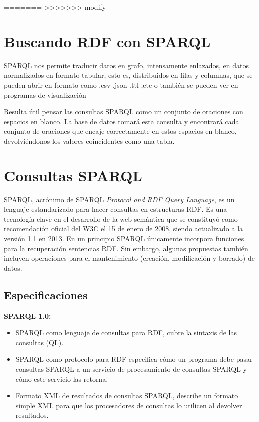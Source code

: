 \documentclass[conference]{IEEEtran}
\begin{document}
\vspace{0.2cm}




\vspace{0.2cm}

=======
>>>>>>> modify
\section{Buscando RDF con SPARQL}
SPARQL nos permite traducir datos en grafo, intensamente enlazados, en datos normalizados en formato tabular, esto es, distribuidos en filas y columnas, que se pueden abrir  en formato como .csv .json .ttl ,etc o también se pueden ver en programas de visualización


Resulta útil pensar las consultas SPARQL como un conjunto de oraciones con espacios en blanco. La base de datos tomará esta consulta y encontrará cada conjunto de oraciones que encaje correctamente en estos espacios en blanco, devolviéndonos los valores coincidentes como una tabla.
\vspace{0.2cm}




\section{Consultas SPARQL}


SPARQL, acrónimo de SPARQL \textit{Protocol and RDF Query Language}, es un lenguaje estandarizado para hacer consultas en estructuras RDF.  Es una tecnología clave en el desarrollo de la web semántica que se constituyó como recomendación oficial del W3C el 15 de enero de 2008, siendo actualizado a la versión 1.1 en 2013\cite{b1}. En un principio SPARQL únicamente incorpora funciones para la recuperación sentencias RDF. Sin embargo, algunas propuestas también incluyen operaciones para el mantenimiento (creación, modificación y borrado) de datos.

\subsection{Especificaciones}

\textbf{SPARQL 1.0:}

\begin{itemize}
	\item SPARQL como lenguaje de consultas para RDF, cubre la sintaxis de las consultas (QL).
	\item SPARQL como protocolo para RDF especifica cómo un programa debe pasar consultas SPARQL a un servicio de procesamiento de consultas SPARQL y cómo este servicio las retorna. 
	\item Formato XML de resultados de consultas SPARQL, describe un formato simple XML para que los procesadores de consultas lo utilicen al devolver resultados.
	
\end{itemize}
\end{document}
